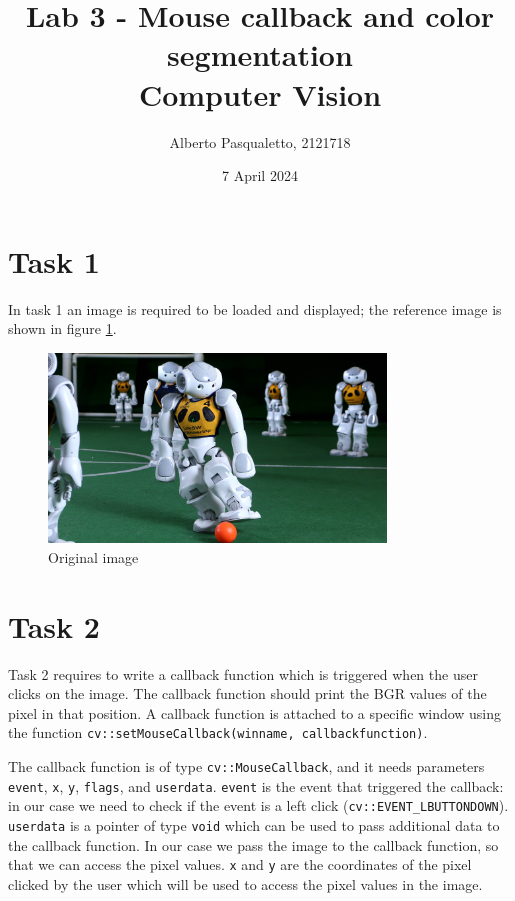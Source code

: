 \documentclass{article}
\title{Lab 3 - Mouse callback and color segmentation\\
	\large{Computer Vision}}
\author{Alberto Pasqualetto, 2121718}
\date{7 April 2024}
\begin{document}
\maketitle


\section*{Task 1}
In task 1 an image is required to be loaded and displayed; the reference image is shown in figure \ref{fig:original}.
\begin{figure}[H]
	\centering
	\includegraphics[width=0.8\textwidth]{../robocup.jpg}
	\caption{Original image}
	\label{fig:original}
\end{figure}


\section*{Task 2}
Task 2 requires to write a callback function which is triggered when the user clicks on the image. The callback function should print the BGR values of the pixel in that position.
A callback function is attached to a specific window using the function \texttt{cv::setMouseCallback(winname, callbackfunction)}.

The callback function is of type \texttt{cv::MouseCallback}, and it needs parameters \texttt{event}, \texttt{x}, \texttt{y}, \texttt{flags}, and \texttt{userdata}.
\texttt{event} is the event that triggered the callback: in our case we need to check if the event is a left click (\texttt{cv::EVENT\_LBUTTONDOWN}).
\texttt{userdata} is a pointer of type \texttt{void} which can be used to pass additional data to the callback function. In our case we pass the image to the callback function, so that we can access the pixel values.
\texttt{x} and \texttt{y} are the coordinates of the pixel clicked by the user which will be used to access the pixel values in the image.
\end{document}
